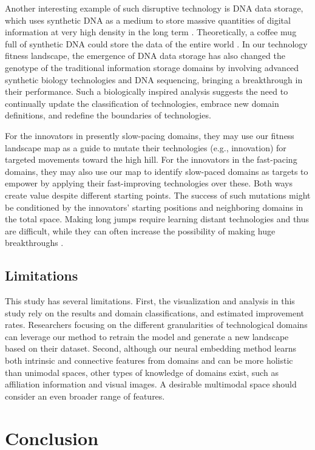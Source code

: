 \documentclass{article}
\begin{document}
Another interesting example of such disruptive technology is DNA data storage, which uses synthetic DNA as a medium to store massive quantities of digital information at very high density in the long term \cite{church2012next}. Theoretically, a coffee mug full of synthetic DNA could store the data of the entire world \cite{erlich2017dna}. In our technology fitness landscape, the emergence of DNA data storage has also changed the genotype of the traditional information storage domains by involving advanced synthetic biology technologies and DNA sequencing, bringing a breakthrough in their performance. Such a biologically inspired analysis suggests the need to continually update the classification of technologies, embrace new domain definitions, and redefine the boundaries of technologies.

For the innovators in presently slow-pacing domains, they may use our fitness landscape map as a guide to mutate their technologies (e.g., innovation) for targeted movements toward the high hill. For the innovators in the fast-pacing domains, they may also use our map to identify slow-paced domains as targets to empower by applying their fast-improving technologies over these. Both ways create value despite different starting points. The success of such mutations might be conditioned by the innovators’ starting positions and neighboring domains in the total space. Making long jumps require learning distant technologies and thus are difficult, while they can often increase the possibility of making huge breakthroughs \cite{Luo2021}.

\subsection{Limitations}

This study has several limitations. First, the visualization and analysis in this study rely on the results and domain classifications, and estimated improvement rates. Researchers focusing on the different granularities of technological domains can leverage our method to retrain the model and generate a new landscape based on their dataset. Second, although our neural embedding method learns both intrinsic and connective features from domains and can be more holistic than unimodal spaces, other types of knowledge of domains exist, such as affiliation information and visual images. A desirable multimodal space should consider an even broader range of features.

\section{Conclusion}
\label{sec:sec5}
\end{document}
